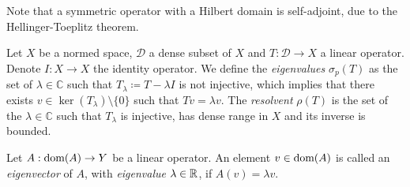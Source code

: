 Note that a symmetric operator with a Hilbert domain is self-adjoint, due to the Hellinger-Toeplitz theorem.
\begin{definition}\label{def:eigenvalues-resolvent}
    Let $X$ be a normed space, $\mathcal{D}$ a dense subset of $X$ and $T:\mathcal{D}\to X$ a linear operator. Denote $I:X\to X$ the identity operator. We define the \emph{eigenvalues} $\sigma_p(T)$ as the set of $\lambda\in\mathbb{C}$ such that $T_\lambda  \coloneqq  T - \lambda I$ is not injective, which implies that there exists $v\in \ker(T_\lambda)\setminus \{0\}$ such that $Tv=\lambda v$. The \emph{resolvent} $\rho(T)$ is the set of the $\lambda\in\mathbb{C}$ such that $T_\lambda$ is injective, has dense range in $X$ and its inverse is bounded.
\end{definition}
\begin{definition}\label{def:eigenvalues-eigenvectors}
    Let $A:\operatorname{\text{dom}}(A)\to Y$ be a linear operator. An element $v\in \operatorname{\text{dom}}(A)$ is called an \emph{eigenvector} of $A$, with \emph{eigenvalue} $\lambda\in\mathbb{R}$, if $A(v) = \lambda v$. 
\end{definition}

